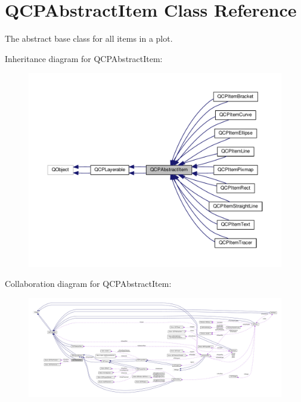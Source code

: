 \hypertarget{class_q_c_p_abstract_item}{}\section{Q\+C\+P\+Abstract\+Item Class Reference}
\label{class_q_c_p_abstract_item}


The abstract base class for all items in a plot.  




Inheritance diagram for Q\+C\+P\+Abstract\+Item\+:\nopagebreak
\begin{figure}[H]
\begin{center}
\leavevmode
\includegraphics[width=350pt]{class_q_c_p_abstract_item__inherit__graph}
\end{center}
\end{figure}


Collaboration diagram for Q\+C\+P\+Abstract\+Item\+:\nopagebreak
\begin{figure}[H]
\begin{center}
\leavevmode
\includegraphics[width=350pt]{class_q_c_p_abstract_item__coll__graph}
\end{center}
\end{figure}
